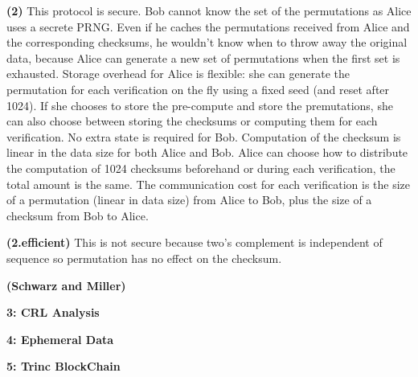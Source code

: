 \documentclass[10pt]{article}
\newcommand\question[2]{\vspace{.1in}\textbf{#1: #2}\vspace{.5em}\vspace{.10in}}
\renewcommand\part[1]{\vspace{.10in}\textbf{(#1)}}
\begin{document}
\part{2}
This protocol is secure. Bob cannot know the set of the permutations as Alice
uses a secrete PRNG. Even if he caches the permutations received from Alice and
the corresponding checksums, he wouldn't know when to throw away the original
data, because Alice can generate a new set of permutations when the first set is
exhausted.
Storage overhead for Alice is flexible: she can generate the permutation 
for each verification on the fly using a fixed seed (and reset after 1024). 
If she chooses to store the pre-compute and store the premutations, she can also
choose between storing the checksums or computing them for each verification.
No extra state is required for Bob.
Computation of the checksum is linear in the data size for both Alice and Bob.
Alice can choose how to distribute the computation of 1024 checksums beforehand
or during each verification, the total amount is the same.
The communication cost for each verification is the size of a permutation
(linear in data size) from Alice to Bob, plus the size of a checksum from Bob to
Alice.

\part{2.efficient}
This is not secure because two's complement is independent of sequence so
permutation has no effect on the checksum.

\part{Schwarz and Miller}

\newpage
\question{3}{CRL Analysis}

\newpage
\question{4}{Ephemeral Data}

\newpage
\question{5}{Trinc BlockChain}
\end{document}
